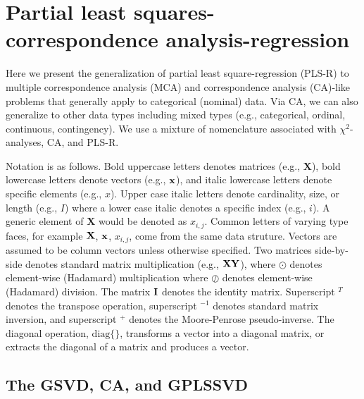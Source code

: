 \documentclass[12pt]{article}
\begin{document}
\hypertarget{partial-least-squares-correspondence-analysis-regression}{%
\section{Partial least squares-correspondence
analysis-regression}\label{partial-least-squares-correspondence-analysis-regression}}

\label{section:PLSCAR}

Here we present the generalization of partial least square-regression
(PLS-R) to multiple correspondence analysis (MCA) and correspondence
analysis (CA)-like problems that generally apply to categorical
(nominal) data. Via CA, we can also generalize to other data types
including mixed types (e.g., categorical, ordinal, continuous,
contingency). We use a mixture of nomenclature associated with
\(\chi^2\)-analyses, CA, and PLS-R.

Notation is as follows. Bold uppercase letters denotes matrices (e.g.,
\(\mathbf{X}\)), bold lowercase letters denote vectors (e.g.,
\(\bf{x}\)), and italic lowercase letters denote specific elements
(e.g., \(x\)). Upper case italic letters denote cardinality, size, or
length (e.g., \(I\)) where a lower case italic denotes a specific index
(e.g., \(i\)). A generic element of \(\mathbf{X}\) would be denoted as
\(x_{i,j}\). Common letters of varying type faces, for example
\({\bf X}\), \(\bf{x}\), \(x_{i,j}\), come from the same data struture.
Vectors are assumed to be column vectors unless otherwise specified. Two
matrices side-by-side denotes standard matrix multiplication (e.g.,
\(\bf{X}\bf{Y}\)), where \(\odot\) denotes element-wise (Hadamard)
multiplication where \(\oslash\) denotes element-wise (Hadamard)
division. The matrix \({\bf I}\) denotes the identity matrix.
Superscript \(^{T}\) denotes the transpose operation, superscript
\(^{-1}\) denotes standard matrix inversion, and superscript \(^{+}\)
denotes the Moore-Penrose pseudo-inverse. The diagonal operation,
\(\mathrm{diag\{\}}\), transforms a vector into a diagonal matrix, or
extracts the diagonal of a matrix and produces a vector.

\hypertarget{the-gsvd-ca-and-gplssvd}{%
\subsection{The GSVD, CA, and GPLSSVD}\label{the-gsvd-ca-and-gplssvd}}

\label{section:GSVDCA}
\end{document}

